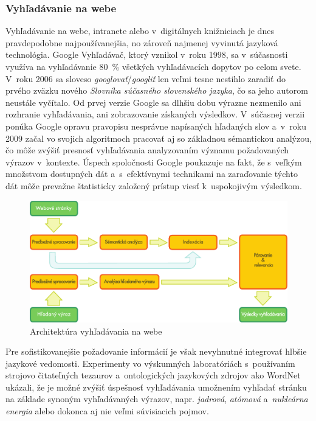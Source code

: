 \begin{multicols}{2}
\subsubsection{Vyhľadávanie na webe}
Vyhľadávanie na webe, intranete alebo v~digitálnych knižniciach je dnes pravdepodobne najpoužívanejšia, no zároveň najmenej vyvinutá jazyková technológia. Google Vyhľadávač, ktorý vznikol v~roku 1998, sa v~súčasnosti využíva na vyhľadávanie 80~\% všetkých vyhľadávacích dopytov po celom svete. V~roku 2006 sa sloveso \emph{googlovať}/\emph{googliť} len veľmi tesne nestihlo zaradiť do prvého zväzku nového \emph{Slovníka súčasného slovenského jazyka}, čo sa jeho autorom neustále vyčítalo. Od prvej verzie Google sa dlhšiu dobu výrazne nezmenilo ani rozhranie vyhľadávania, ani zobrazovanie získaných výsledkov. V~súčasnej verzii ponúka Google opravu pravopisu nesprávne napísaných hľadaných slov a~v~roku 2009 začal vo svojich algoritmoch pracovať aj so základnou sémantickou analýzou\cite{pc1}, čo môže zvýšiť presnosť vyhľadávania analyzovaním významu požadovaných výrazov v~kontexte. Úspech spoločnosti Google poukazuje na fakt, že s~veľkým množstvom dostupných dát a~s~efektívnymi technikami na zaraďovanie týchto dát môže prevažne štatisticky založený prístup viesť k~uspokojivým výsledkom.

\begin{figure}[htb]
  \center
  \includegraphics[width=\textwidth]{../_media/slovak/web_search_architecture}
  \caption{Architektúra vyhľadávania na webe}
  \label{fig:websearcharch_sk}
\end{figure}

Pre sofistikovanejšie požadovanie informácií je však nevyhnutné integrovať hlbšie jazykové vedomosti. Experimenty vo výskumných laboratóriách s~používaním strojovo čitateľných tezaurov a~ontologických jazykových zdrojov ako WordNet ukázali, že je možné zvýšiť úspešnosť vyhľadávania umožnením vyhľadať stránku na základe synoným vyhľadávaných výrazov, napr. \emph{jadrová}, \emph{atómová} a~\emph{nukleárna energia} alebo dokonca aj nie veľmi súvisiacich pojmov. 


\end{multicols}
